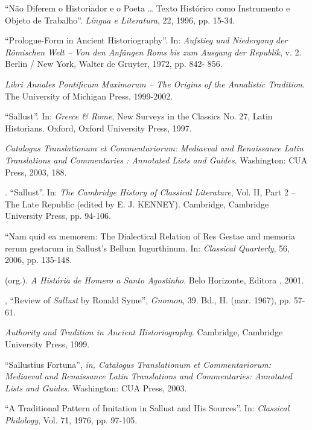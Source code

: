 \begin{bibliohedra}
 
 ``Não Diferem o Historiador e o Poeta … Texto Histórico como Instrumento e Objeto de Trabalho”. \emph{Língua e Literatura}, 22, 1996, pp. 15-34.

  “Prologue-Form in Ancient Historiography”. In: \emph{Aufstieg und Niedergang der Römischen Welt – Von den Anfängen Roms bis zum Ausgang der Republik}, v. 2. Berlin / New York, Walter de Gruyter, 1972, pp. 842- 856.

 

 \emph{Libri Annales Pontificum Maximorum – The Origins of the Annalistic Tradition}. The University of Michigan Press, 1999-2002. 

 “Sallust”. In: \emph{Greece \& Rome}, New Surveys in the Classics No. 27, Latin Historians. Oxford, Oxford University Press, 1997.

 \emph{Catalogus Translationum et Commentariorum: Mediaeval and Renaissance Latin Translations and Commentaries : Annotated Lists and Guides}. Washington: CUA Press, 2003, 188.

. “Sallust”. In: \emph{The Cambridge History of Classical Literature}, Vol. II, Part 2 – The Late Republic (edited by E. J. KENNEY). Cambridge, Cambridge University Press, pp. 94-106.

 “Nam quid ea memorem: The Dialectical Relation of Res Gestae and memoria rerum gestarum in Sallust’s Bellum Iugurthinum. In: \emph{Classical Quarterly}, 56, 2006, pp. 135-148.

 (org.). \emph{A História de Homero a Santo Agostinho}. Belo Horizonte, Editora , 2001. 


, “Review of \emph{Sallust} by Ronald Syme”, \emph{Gnomon}, 39. Bd., H. (mar. 1967), pp. 57-61.

 
 

 \emph{Authority and Tradition in Ancient Historiography}. Cambridge, Cambridge University Press, 1999.

 

 “Sallustius Fortuna”, \emph{in, Catalogus Translationum et Commentariorum: Mediaeval and Renaissance Latin Translations and Commentaries: Annotated Lists and Guides}. Washington: CUA Press, 2003.

 
 

 “A Traditional Pattern of Imitation in Sallust and His Sources”. In: \emph{Classical Philology}, Vol. 71, 1976, pp. 97-105.


\end{bibliohedra}
